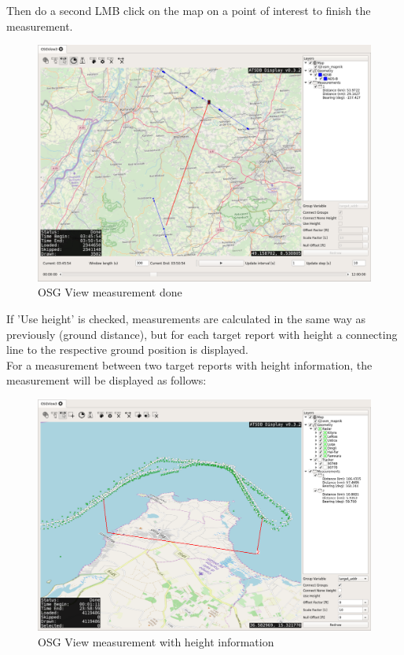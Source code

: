 Then do a second LMB click on the map on a point of interest to finish the measurement.

\begin{figure}[H]
    \hspace*{-2cm}
    \includegraphics[width=18cm,frame]{../screenshots/osgview_measure2.png}
  \caption{OSG View measurement done}
\end{figure}

If 'Use height' is checked, measurements are calculated in the same way as previously (ground distance), but for each target report with height a connecting line to the respective ground position is displayed. \\

For a measurement between two target reports with height information, the measurement will be displayed as follows:

\begin{figure}[H]
    \hspace*{-2cm}
    \includegraphics[width=18cm,frame]{../screenshots/osgview_measure3d.png}
  \caption{OSG View measurement with height information}
\end{figure}

